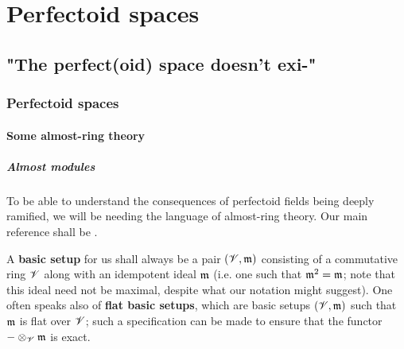 \chapter{Perfectoid spaces}
    \begin{abstract}
        
    \end{abstract}
    
    \section{"The perfect(oid) space doesn't exi-"} \label{section: perfectoid_spaces}
        \subsection{Perfectoid spaces}
            \subsubsection{Some almost-ring theory}
                \paragraph{Almost modules}
                    To be able to understand the consequences of perfectoid fields being deeply ramified, we will be needing the language of almost-ring theory. Our main reference shall be \cite[Chapter 14]{gabber_ramero_almost_ring_theory}.
                    
                    \begin{convention} \label{conv: basic_setups}
                        A \textbf{basic setup} for us shall always be a pair $(\mathscr{V}, \mathfrak{m})$ consisting of a commutative ring $\mathscr{V}$ along with an idempotent ideal $\mathfrak{m}$ (i.e. one such that $\mathfrak{m}^2 = \mathfrak{m}$; note that this ideal need not be maximal, despite what our notation might suggest). One often speaks also of \textbf{flat basic setups}, which are basic setups $(\mathscr{V}, \mathfrak{m})$ such that $\mathfrak{m}$ is flat over $\mathscr{V}$; such a specification can be made to ensure that the functor $- \tensor_{\scrV} \m$ is exact.
                    \end{convention}
                    
